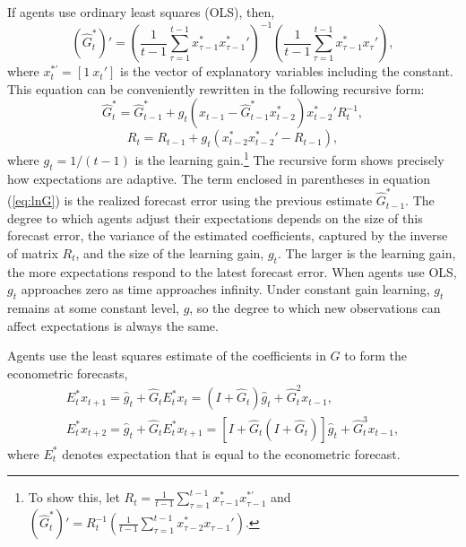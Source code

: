 \documentclass[10pt]{article}
\newcommand{\beq}{\begin{equation}}
\newcommand{\eeq}{\end{equation}}
\newcommand{\h}[1]{\hat{#1}}
\newcommand{\ds}{\displaystyle}
\begin{document}
If agents use ordinary least squares (OLS), then,
\beq \label{eq:Gsum} \left(\hat{G}_t^*\right)' = \left( \frac{1}{t-1} \sum_{\tau=1}^{t-1} x_{\tau-1}^* {x_{\tau-1}^{*}}' \right)^{-1} \left( \frac{1}{t-1} \sum_{\tau=1}^{t-1} x_{\tau-1}^* x_{\tau}' \right), \eeq 
where $x_t^{*'} = [1~ x_t']$ is the vector of explanatory variables including the constant.  This equation can be conveniently rewritten in the following recursive form:
\beq \label{eq:lnG} \hat{G}_t^* = \hat{G}_{t-1}^* + g_t (x_{t-1} - \hat{G}_{t-1}^* x_{t-2}^*) {x_{t-2}^*}' R_t^{-1} ,\eeq
\beq \label{eq:lnR} R_t = R_{t-1} + g_t (x_{t-2}^* {x_{t-2}^*}' - R_{t-1}), \eeq
where $g_t=1/(t-1)$ is the learning gain.\footnote{To show this, let $R_t = \frac{1}{t-1} \sum_{\tau=1}^{t-1} x_{\tau-1}^* x_{\tau-1}^{*'}$ and $\left(\hat{G}_t^*\right)' = R_t^{-1} \left( \frac{1}{t-1} \sum_{\tau=1}^{t-1} x_{\tau-2}^* x_{\tau-1}' \right)$.}
The recursive form shows precisely how expectations are adaptive.  The term enclosed in parentheses in equation (\ref{eq:lnG}) is the realized forecast error using the previous estimate $\hat{G}_{t-1}^*$.  The degree to which agents adjust their expectations depends on the size of this forecast error, the variance of the estimated coefficients, captured by the inverse of matrix $R_t$, and the size of the learning gain, $g_t$.  The larger is the learning gain, the more expectations respond to the latest forecast error.  When agents use OLS, $g_t$ approaches zero as time approaches infinity.  Under constant gain learning, $g_t$ remains at some constant level, $g$, so the degree to which new observations can affect expectations is always the same.  

Agents use the least squares estimate of the coefficients in $G$ to form the econometric forecasts,
\beq \label{eq:agfore} \begin{array}{c} 
\ds E_t^* x_{t+1} = \h{g}_{t} + \h{G}_t E_t^* x_t = (I + \h{G}_t)\h{g}_{t} + \h{G}_t^2 x_{t-1}, \\ [1pc]
\ds E_t^* x_{t+2}  =\h{g}_{t} + \h{G}_t E_t^* x_{t+1} = \left[ I + \h{G}_t (I + \h{G}_t) \right] \h{g}_{t} + \h{G}_t^3 x_{t-1},
\end{array} \eeq
where $E_t^*$ denotes expectation that is equal to the econometric forecast.
\end{document}
